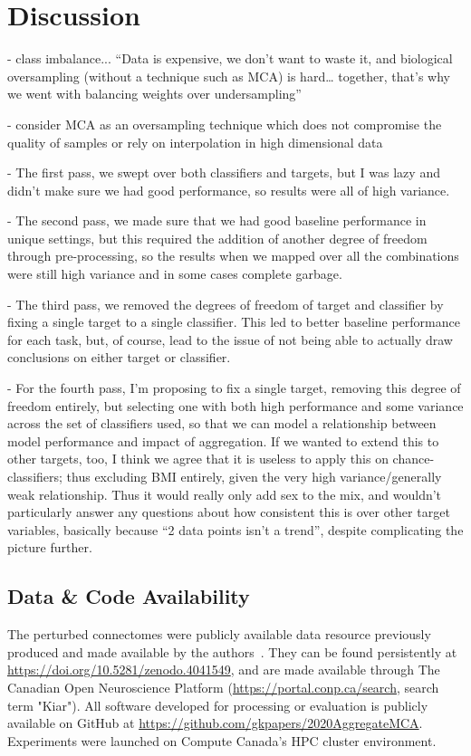 \documentclass[fleqn,10pt]{SelfArx} %
\begin{document}
\section*{Discussion}
- class imbalance... “Data is expensive, we don’t want to waste it, and biological oversampling (without a technique such as MCA) is hard… together, that’s why we went with balancing weights over undersampling”

- consider MCA as an oversampling technique which does not compromise the quality of samples or rely on interpolation in high dimensional data

- The first pass, we swept over both classifiers and targets, but I was lazy and didn’t make sure we had good performance, so results were all of high variance.

- The second pass, we made sure that we had good baseline performance in unique settings, but this required the addition of another degree of freedom through pre-processing, so the results when we mapped over all the combinations were still high variance and in some cases complete garbage.

- The third pass, we removed the degrees of freedom of target and classifier by fixing a single target to a single classifier. This led to better baseline performance for each task, but, of course, lead to the issue of not being able to actually draw conclusions on either target or classifier.

- For the fourth pass, I’m proposing to fix a single target, removing this degree of freedom entirely, but selecting one with both high performance and some variance across the set of classifiers used, so that we can model a relationship between model performance and impact of aggregation. If we wanted to extend this to other targets, too, I think we agree that it is useless to apply this on chance-classifiers; thus excluding BMI entirely, given the very high variance/generally weak relationship. Thus it would really only add sex to the mix, and wouldn’t particularly answer any questions about how consistent this is over other target variables, basically because “2 data points isn’t a trend”, despite complicating the picture further.

\subsection*{Data \& Code Availability}
The perturbed connectomes were publicly available data resource previously produced and made available by the
authors~\cite{Kiar2020-yz}. They can be found persistently at \url{https://doi.org/10.5281/zenodo.4041549}, and are
made available through The Canadian Open Neuroscience Platform (\url{https://portal.conp.ca/search}, search term
"Kiar"). All software developed for processing or evaluation is publicly available on GitHub at
\url{https://github.com/gkpapers/2020AggregateMCA}. Experiments were launched on Compute Canada's HPC cluster
environment. 
\end{document}
